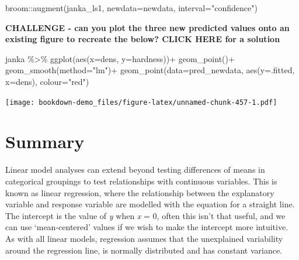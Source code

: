 \documentclass[
]{book}
\newenvironment{Shaded}{\begin{snugshade}}{\end{snugshade}}
\newcommand{\AttributeTok}[1]{\textcolor[rgb]{0.77,0.63,0.00}{#1}}
\newcommand{\FunctionTok}[1]{\textcolor[rgb]{0.00,0.00,0.00}{#1}}
\newcommand{\NormalTok}[1]{#1}
\newcommand{\SpecialCharTok}[1]{\textcolor[rgb]{0.00,0.00,0.00}{#1}}
\newcommand{\StringTok}[1]{\textcolor[rgb]{0.31,0.60,0.02}{#1}}
\begin{document}
\begin{Shaded}
\begin{Highlighting}[]
\NormalTok{broom}\SpecialCharTok{::}\FunctionTok{augment}\NormalTok{(janka\_ls1, }\AttributeTok{newdata=}\NormalTok{newdata, }\AttributeTok{interval=}\StringTok{"confidence"}\NormalTok{)}
\end{Highlighting}
\end{Shaded}

\textbf{CHALLENGE - can you plot the three new predicted values onto an existing figure to recreate the below? CLICK HERE for a solution}

\begin{Shaded}
\begin{Highlighting}[]
\NormalTok{janka }\SpecialCharTok{\%\textgreater{}\%} 
  \FunctionTok{ggplot}\NormalTok{(}\FunctionTok{aes}\NormalTok{(}\AttributeTok{x=}\NormalTok{dens, }\AttributeTok{y=}\NormalTok{hardness))}\SpecialCharTok{+}
  \FunctionTok{geom\_point}\NormalTok{()}\SpecialCharTok{+}
  \FunctionTok{geom\_smooth}\NormalTok{(}\AttributeTok{method=}\StringTok{"lm"}\NormalTok{)}\SpecialCharTok{+}
  \FunctionTok{geom\_point}\NormalTok{(}\AttributeTok{data=}\NormalTok{pred\_newdata, }\FunctionTok{aes}\NormalTok{(}\AttributeTok{y=}\NormalTok{.fitted, }\AttributeTok{x=}\NormalTok{dens), }\AttributeTok{colour=}\StringTok{"red"}\NormalTok{)}
\end{Highlighting}
\end{Shaded}

\texttt{[image: bookdown-demo\_files/figure-latex/unnamed-chunk-457-1.pdf]}

\hypertarget{summary-5}{%
\section{Summary}\label{summary-5}}

Linear model analyses can extend beyond testing differences of means in categorical groupings to test relationships with continuous variables. This is known as linear regression, where the relationship between the explanatory variable and response variable are modelled with the equation for a straight line. The intercept is the value of \emph{y} when \emph{x} = 0, often this isn't that useful, and we can use `mean-centered' values if we wish to make the intercept more intuitive.
As with all linear models, regression assumes that the unexplained variability around the regression line, is normally distributed and has constant variance.
\end{document}
